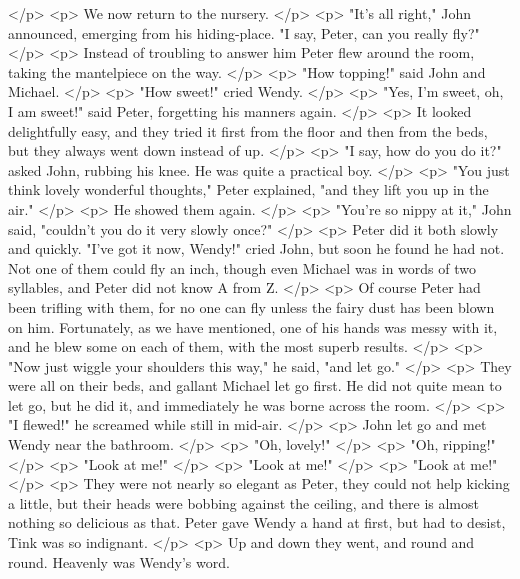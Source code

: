     </p>
    <p>
      We now return to the nursery.
    </p>
    <p>
      "It's all right," John announced, emerging from his hiding-place. "I say,
      Peter, can you really fly?"
    </p>
    <p>
      Instead of troubling to answer him Peter flew around the room, taking the
      mantelpiece on the way.
    </p>
    <p>
      "How topping!" said John and Michael.
    </p>
    <p>
      "How sweet!" cried Wendy.
    </p>
    <p>
      "Yes, I'm sweet, oh, I am sweet!" said Peter, forgetting his manners
      again.
    </p>
    <p>
      It looked delightfully easy, and they tried it first from the floor and
      then from the beds, but they always went down instead of up.
    </p>
    <p>
      "I say, how do you do it?" asked John, rubbing his knee. He was quite a
      practical boy.
    </p>
    <p>
      "You just think lovely wonderful thoughts," Peter explained, "and they
      lift you up in the air."
    </p>
    <p>
      He showed them again.
    </p>
    <p>
      "You're so nippy at it," John said, "couldn't you do it very slowly once?"
    </p>
    <p>
      Peter did it both slowly and quickly. "I've got it now, Wendy!" cried
      John, but soon he found he had not. Not one of them could fly an inch,
      though even Michael was in words of two syllables, and Peter did not know
      A from Z.
    </p>
    <p>
      Of course Peter had been trifling with them, for no one can fly unless the
      fairy dust has been blown on him. Fortunately, as we have mentioned, one
      of his hands was messy with it, and he blew some on each of them, with the
      most superb results.
    </p>
    <p>
      "Now just wiggle your shoulders this way," he said, "and let go."
    </p>
    <p>
      They were all on their beds, and gallant Michael let go first. He did not
      quite mean to let go, but he did it, and immediately he was borne across
      the room.
    </p>
    <p>
      "I flewed!" he screamed while still in mid-air.
    </p>
    <p>
      John let go and met Wendy near the bathroom.
    </p>
    <p>
      "Oh, lovely!"
    </p>
    <p>
      "Oh, ripping!"
    </p>
    <p>
      "Look at me!"
    </p>
    <p>
      "Look at me!"
    </p>
    <p>
      "Look at me!"
    </p>
    <p>
      They were not nearly so elegant as Peter, they could not help kicking a
      little, but their heads were bobbing against the ceiling, and there is
      almost nothing so delicious as that. Peter gave Wendy a hand at first, but
      had to desist, Tink was so indignant.
    </p>
    <p>
      Up and down they went, and round and round. Heavenly was Wendy's word.
